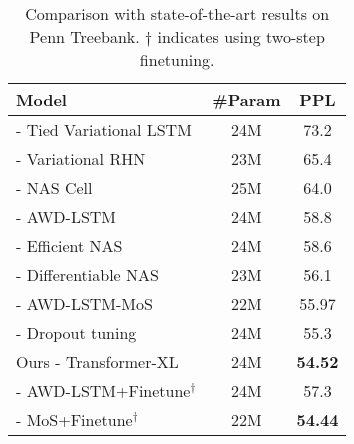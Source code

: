 \documentclass[11pt,a4paper]{article}
\begin{document}
\begin{table}[t]
    \small
    \centering
    \begin{adjustwidth}{-5pt}{}
    \begin{tabular}{l|cc}
        \toprule
        \bf Model & \bf \#Param & \bf PPL \\
        \midrule
\citet{inan2016tying} - Tied Variational LSTM & 24M & 73.2 \\
        \citet{zilly2016recurrent} - Variational RHN & 23M & 65.4 \\
        \citet{zoph2016neural} - NAS Cell & 25M & 64.0 \\
        \citet{merity2017regularizing} - AWD-LSTM & 24M & 58.8 \\
        \citet{pham2018efficient} - Efficient NAS & 24M & 58.6 \\
        \citet{liu2018darts} - Differentiable NAS & 23M & 56.1 \\
        \citet{yang2017breaking} - AWD-LSTM-MoS & 22M & 55.97 \\
        \citet{melis2018pushing} - Dropout tuning & 24M & 55.3 \\
        \midrule
        Ours - Transformer-XL & 24M & \textbf{54.52} \\
        \midrule
        \citet{merity2017regularizing} - AWD-LSTM+Finetune$^\dagger$ & 24M & 57.3 \\
        \citet{yang2017breaking} - MoS+Finetune$^\dagger$ & 22M & \textbf{54.44} \\
        \bottomrule
    \end{tabular}
    \caption{\small
        Comparison with state-of-the-art results on Penn Treebank. $\dagger$ indicates using two-step finetuning.
    }
    \label{table:ptb}
	\end{adjustwidth}
\end{table}
\egroup
\end{document}
